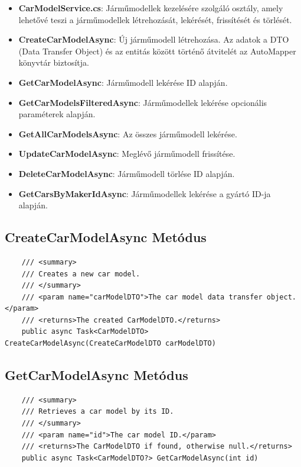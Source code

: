 \documentclass{report}[11pt]
\begin{document}
\begin{itemize}
    \item \textbf{CarModelService.cs}: Járműmodellek kezelésére szolgáló osztály, amely lehetővé teszi a járműmodellek létrehozását, lekérését, frissítését és törlését.
    \item \textbf{CreateCarModelAsync}: Új járműmodell létrehozása. Az adatok a DTO (Data Transfer Object) és az entitás között történő átvitelét az AutoMapper könyvtár biztosítja.
    \item \textbf{GetCarModelAsync}: Járműmodell lekérése ID alapján.
    \item \textbf{GetCarModelsFilteredAsync}: Járműmodellek lekérése opcionális paraméterek alapján.
    \item \textbf{GetAllCarModelsAsync}: Az összes járműmodell lekérése.
    \item \textbf{UpdateCarModelAsync}: Meglévő járműmodell frissítése.
    \item \textbf{DeleteCarModelAsync}: Járműmodell törlése ID alapján.
    \item \textbf{GetCarsByMakerIdAsync}: Járműmodellek lekérése a gyártó ID-ja alapján.
\end{itemize}

\subsection*{CreateCarModelAsync Metódus}
\begin{lstlisting}
    /// <summary>
    /// Creates a new car model.
    /// </summary>
    /// <param name="carModelDTO">The car model data transfer object.</param>
    /// <returns>The created CarModelDTO.</returns>
    public async Task<CarModelDTO> CreateCarModelAsync(CreateCarModelDTO carModelDTO)
\end{lstlisting}

\subsection*{GetCarModelAsync Metódus}
\begin{lstlisting}
    /// <summary>
    /// Retrieves a car model by its ID.
    /// </summary>
    /// <param name="id">The car model ID.</param>
    /// <returns>The CarModelDTO if found, otherwise null.</returns>
    public async Task<CarModelDTO?> GetCarModelAsync(int id)
\end{lstlisting}
\end{document}
